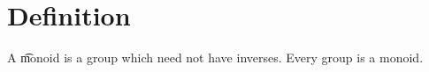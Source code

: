 

\section*{Definition}

A \t{monoid} is a group which need not have inverses.
Every group is a monoid.

\blankpage